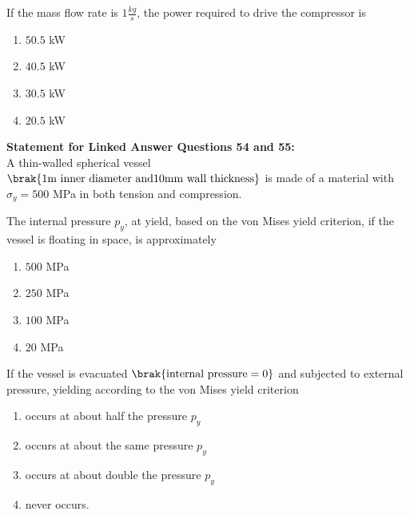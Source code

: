 \iffalse
                       
                        
                        
                        
                    
                        \author{AI24BTECH11006 - Bugada Roopansha}
                        \section{ae}
                        \chapter{2012}
                        \fi
 
    \item If the mass flow rate is $1 \frac{kg}{s}$, the power required to drive the compressor is
    \begin{enumerate}
        \item $50.5$ kW
        \item $40.5$ kW
        \item $30.5$ kW
        \item $20.5$ kW
    \end{enumerate}

    \textbf{Statement for Linked Answer Questions 54 and 55:} \\
    A thin-walled spherical vessel $\brak{1 \text{m inner diameter and} 10 \text{mm wall thickness}}$ is made of a material with $\sigma_y = 500$ MPa in both tension and compression.

    \item The internal pressure $p_y$, at yield, based on the von Mises yield criterion, if the vessel is floating in space, is approximately
    \begin{enumerate}
        \item $500$ MPa
        \item $250$ MPa
        \item $100$ MPa
        \item $20$ MPa
    \end{enumerate}

    \item If the vessel is evacuated $\brak{\text{internal pressure} =0}$ and subjected to external pressure, yielding according to the von Mises yield criterion 
    \begin{enumerate}
        \item occurs at about half the pressure $p_y$
        \item occurs at about the same pressure $p_y$
        \item occurs at about double the pressure $p_y$
        \item never occurs.
    \end{enumerate}

